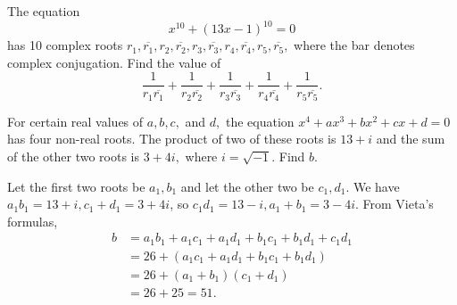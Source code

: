 \documentclass[11pt]{article}
\theoremstyle{definition}
\begin{document}
%
%	
%
%
%
%






\begin{question}[name={1994 AIME, \href{https://artofproblemsolving.com/community/c4p394743}{Problem 13}}]
	The equation\[ x^{10}+(13x-1)^{10}=0 \]has 10 complex roots $r_1, \overline{r_1}, r_2, \overline{r_2}, r_3, \overline{r_3}, r_4, \overline{r_4}, r_5, \overline{r_5},$ where the bar denotes complex conjugation. Find the value of\[ \frac 1{r_1\overline{r_1}}+\frac 1{r_2\overline{r_2}}+\frac 1{r_3\overline{r_3}}+\frac 1{r_4\overline{r_4}}+\frac 1{r_5\overline{r_5}}. \]
\end{question}

%
%	
%
%











\begin{question}[name={1995 AIME, \href{https://artofproblemsolving.com/community/c4p394478}{Problem 5}}]
	For certain real values of $a, b, c,$ and $d,$ the equation $x^4+ax^3+bx^2+cx+d=0$ has four non-real roots. The product of two of these roots is $13+i$ and the sum of the other two roots is $3+4i,$ where $i=\sqrt{-1}.$ Find $b.$	
\end{question}


\begin{solution}[name={Solution by OlympusHero}]
	Let the first two roots be $a_1, b_1$ and let the other two be $c_1, d_1$. We have $a_1b_1=13+i, c_1+d_1=3+4i$, so $c_1d_1=13-i, a_1+b_1=3-4i$. From Vieta's formulas,
	\begin{align*}
		b &= a_1b_1+a_1c_1+a_1d_1+b_1c_1+b_1d_1+c_1d_1\\
		&= 26+(a_1c_1+a_1d_1+b_1c_1+b_1d_1)\\
		&= 26+(a_1+b_1)(c_1+d_1)\\
		&= 26+25=\boxed{51}.
	\end{align*}
\end{solution}
\end{document}
